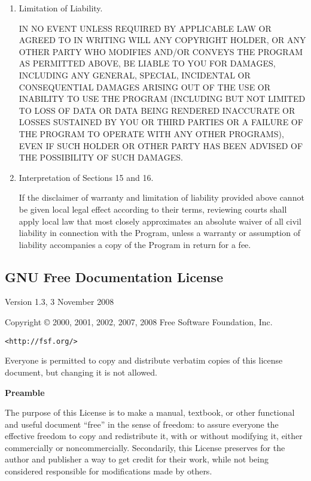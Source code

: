 \documentclass{article}
\begin{document}
\begin{enumerate}
\item Limitation of Liability.

 IN NO EVENT UNLESS REQUIRED BY APPLICABLE LAW OR AGREED TO IN
 WRITING WILL ANY COPYRIGHT HOLDER, OR ANY OTHER PARTY WHO MODIFIES
 AND/OR CONVEYS THE PROGRAM AS PERMITTED ABOVE, BE LIABLE TO YOU FOR
 DAMAGES, INCLUDING ANY GENERAL, SPECIAL, INCIDENTAL OR CONSEQUENTIAL
 DAMAGES ARISING OUT OF THE USE OR INABILITY TO USE THE PROGRAM
 (INCLUDING BUT NOT LIMITED TO LOSS OF DATA OR DATA BEING RENDERED
 INACCURATE OR LOSSES SUSTAINED BY YOU OR THIRD PARTIES OR A FAILURE
 OF THE PROGRAM TO OPERATE WITH ANY OTHER PROGRAMS), EVEN IF SUCH
 HOLDER OR OTHER PARTY HAS BEEN ADVISED OF THE POSSIBILITY OF SUCH
 DAMAGES.

\item Interpretation of Sections 15 and 16.

If the disclaimer of warranty and limitation of liability provided
above cannot be given local legal effect according to their terms,
reviewing courts shall apply local law that most closely approximates
an absolute waiver of all civil liability in connection with the
Program, unless a warranty or assumption of liability accompanies a
copy of the Program in return for a fee.

\end{enumerate}


\subsection{GNU Free Documentation License}
\label{subsubsec:fdl}

 \begin{center}

       Version 1.3, 3 November 2008


 Copyright \copyright{} 2000, 2001, 2002, 2007, 2008  Free Software Foundation, Inc.
 
 \bigskip
 
     \texttt{<http://fsf.org/>}
  
 \bigskip
 
 Everyone is permitted to copy and distribute verbatim copies
 of this license document, but changing it is not allowed.
\end{center}


\begin{center}
{\bf\large Preamble}
\end{center}

The purpose of this License is to make a manual, textbook, or other
functional and useful document ``free'' in the sense of freedom: to
assure everyone the effective freedom to copy and redistribute it,
with or without modifying it, either commercially or noncommercially.
Secondarily, this License preserves for the author and publisher a way
to get credit for their work, while not being considered responsible
for modifications made by others.
\end{document}
